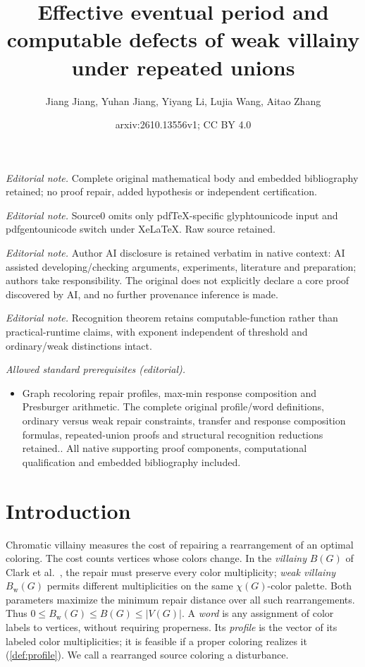\documentclass[10pt,a4paper]{amsart}
\title{Effective eventual period and computable defects of weak villainy under repeated unions}
\author{Jiang Jiang, Yuhan Jiang, Yiyang Li, Lujia Wang, Aitao Zhang}
\date{arxiv:2610.13556v1; CC BY 4.0}
\numberwithin{equation}{section}
\theoremstyle{definition}
\theoremstyle{remark}
\begin{document}
\maketitle
\noindent\textit{Editorial note.} Complete original mathematical body and embedded bibliography retained; no proof repair, added hypothesis or independent certification.\par\medskip
\noindent\textit{Editorial note.} Source0 omits only pdfTeX-specific glyphtounicode input and pdfgentounicode switch under XeLaTeX. Raw source retained.\par\medskip
\noindent\textit{Editorial note.} Author AI disclosure is retained verbatim in native context: AI assisted developing/checking arguments, experiments, literature and preparation; authors take responsibility. The original does not explicitly declare a core proof discovered by AI, and no further provenance inference is made.\par\medskip
\noindent\textit{Editorial note.} Recognition theorem retains computable-function rather than practical-runtime claims, with exponent independent of threshold and ordinary/weak distinctions intact.\par\medskip
\noindent\textit{Allowed standard prerequisites (editorial).}\begin{itemize}
\item Graph recoloring repair profiles, max-min response composition and Presburger arithmetic. The complete original profile/word definitions, ordinary versus weak repair constraints, transfer and response composition formulas, repeated-union proofs and structural recognition reductions retained.. All native supporting proof components, computational qualification and embedded bibliography included.
\end{itemize}\medskip
\section{Introduction}

Chromatic villainy measures the cost of repairing a rearrangement of
an optimal coloring. The cost counts vertices whose colors change.
In the \emph{villainy} $B(G)$ of Clark et al.~\cite{clark2006},
the repair must preserve every color multiplicity; \emph{weak
villainy} $B_{\mathrm w}(G)$ permits different multiplicities on the
same $\chi(G)$-color palette. Both parameters maximize the minimum
repair distance over all such rearrangements. Thus
$0\le B_{\mathrm w}(G)\le B(G)\le |V(G)|$.
A \emph{word} is any assignment of color labels to vertices, without
requiring properness. Its \emph{profile} is the vector of its labeled color
multiplicities; it is feasible if a proper coloring realizes it
(\cref{def:profile}). We call a rearranged source coloring a disturbance.
\end{document}
